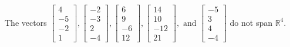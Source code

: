 \begin{exercise}
\begin{exerciseStatement}
  \end{exerciseStatement}
  \begin{exerciseAnswer}
   The vectors \(\left[\begin{array}{r}
4 \\
-5 \\
-2 \\
1
\end{array}\right] , \left[\begin{array}{r}
-2 \\
-3 \\
2 \\
-4
\end{array}\right] , \left[\begin{array}{r}
6 \\
9 \\
-6 \\
12
\end{array}\right] , \left[\begin{array}{r}
14 \\
10 \\
-12 \\
21
\end{array}\right] , \text{ and } \left[\begin{array}{r}
-5 \\
3 \\
4 \\
-4
\end{array}\right]\) 
  	 do not  
	span \(\mathbb{R}^4\).
  


  \end{exerciseAnswer}
\end{exercise}